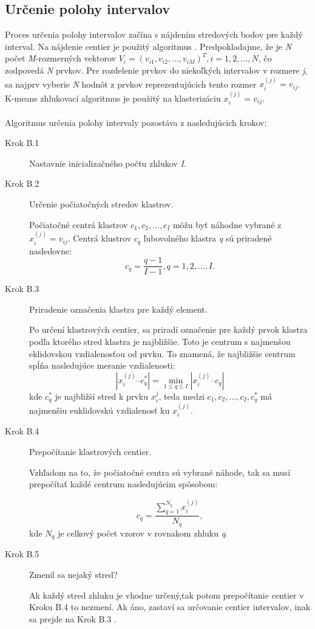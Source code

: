 \subsection{Určenie polohy intervalov}

Proces určenia polohy intervalov začína s nájdením stredových bodov pre každý interval. Na nájdenie centier je použitý algoritmus \cite{chi36, duda37}. 
Predpokladajme, že je \textit{N} počet \textit{M}-rozmerných vektorov $V_i=(v_{i1}, v_{i2},…, v_{iM} )^T, i = 1, 2, \ldots, N$, čo zodpovedá \textit{N} prvkov. Pre rozdelenie prvkov do niekoľkých intervalov v rozmere \textit{j}, sa najprv vyberie \textit{N} hodnôt z prvkov reprezentujúcich tento rozmer $x_i^{(j)} = v_{ij}$. K-means zhlukovací algoritmus je použitý na klasterizáciu $x_i^{(j)} = v_{ij}.$ \cite{lee2001}
\paragraph{}
Algoritmus určenia polohy intervaly pozostáva z nasledujúcich krokov: 
\begin{description}
\item[Krok B.1] Nastavnie inicializačného počtu zhlukov \textit{I}. 
\item[Krok B.2] Určenie počiatočných stredov klastrov. 


Počiatočné centrá klastrov $c_1, c_2, \ldots, c_I$ môžu byť náhodne vybrané z $x_i^{(j)} = v_{i j}.$ Centrá klustrov $c_q$ ľubovolného klastra\textit{ q} sú priradené nasledovne: 
$$ c_q = \frac{q-1}{I-1},  q = 1, 2, \ldots, I.  $$
\item[Krok B.3] Priradenie označenia klastra pre každý element. 


Po určení klastrových centier,  sa priradí označenie pre každý prvok klastra podľa ktorého stred klastra je najbližšie. Toto je centrum s najmenšou eklidovskou vzdialenosťou od prvku. To znamená, že najbližšie centrum spĺňa nasledujúce meranie vzdialenosti: 
$$\left| {x_i^{(j)} – c_q^*} \right|  = \min\limits_{1 \leq q \leq I}  \left| {x_i^{(j)} –  c_q} \right|  $$
kde $c_q^*$ je najbližší stred k prvku $x_i^{j}$, teda medzi $c_1, c_2, \ldots,  c_I, c_q^*$ má najmenšiu euklidovskú vzdialenosť ku $x_i^{(j)}$.

\item[Krok B.4]Prepočítanie klastrových centier.

 
Vzhľadom na to, že počiatočné centra sú vybrané náhode, tak sa musí prepočítať  každé centrum nasledujúcim spôsobom: 

 $$c_q=\frac{\sum\limits_{q=1}^{N_q} x_i^{(j)} }{N_q}, $$
kde $N_q$ je celkový počet vzorov v rovnakom zhluku \textit{q}. 

\item[Krok B.5] Zmenil sa nejaký stred? 

Ak každý stred zhluku je vhodne určený,tak potom prepočítanie centier v Kroku B.4 to nezmení. Ak áno, zastaví sa určovanie centier intervalov, inak sa prejde na Krok B.3 \cite{lee2001}.
\end{description}


